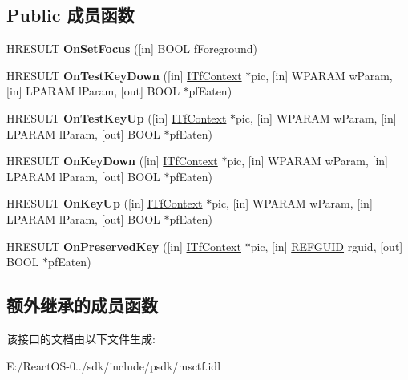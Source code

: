 \subsection*{Public 成员函数}
\begin{DoxyCompactItemize}
\item 
\mbox{\label{interface_i_tf_key_event_sink_ab5d245d1cc541701333e56dedc5832b3}} 
H\+R\+E\+S\+U\+LT {\bfseries On\+Set\+Focus} (\mbox{[}in\mbox{]} B\+O\+OL f\+Foreground)
\item 
\mbox{\label{interface_i_tf_key_event_sink_ac73b3ced70cd2eb7e9aee17ff839966a}} 
H\+R\+E\+S\+U\+LT {\bfseries On\+Test\+Key\+Down} (\mbox{[}in\mbox{]} \hyperlink{interface_i_tf_context}{I\+Tf\+Context} $\ast$pic, \mbox{[}in\mbox{]} W\+P\+A\+R\+AM w\+Param, \mbox{[}in\mbox{]} L\+P\+A\+R\+AM l\+Param, \mbox{[}out\mbox{]} B\+O\+OL $\ast$pf\+Eaten)
\item 
\mbox{\label{interface_i_tf_key_event_sink_a98bb99ca64e60dde14b9541c665eb604}} 
H\+R\+E\+S\+U\+LT {\bfseries On\+Test\+Key\+Up} (\mbox{[}in\mbox{]} \hyperlink{interface_i_tf_context}{I\+Tf\+Context} $\ast$pic, \mbox{[}in\mbox{]} W\+P\+A\+R\+AM w\+Param, \mbox{[}in\mbox{]} L\+P\+A\+R\+AM l\+Param, \mbox{[}out\mbox{]} B\+O\+OL $\ast$pf\+Eaten)
\item 
\mbox{\label{interface_i_tf_key_event_sink_a6fa610a788e4e2bc84f3a706a353c84e}} 
H\+R\+E\+S\+U\+LT {\bfseries On\+Key\+Down} (\mbox{[}in\mbox{]} \hyperlink{interface_i_tf_context}{I\+Tf\+Context} $\ast$pic, \mbox{[}in\mbox{]} W\+P\+A\+R\+AM w\+Param, \mbox{[}in\mbox{]} L\+P\+A\+R\+AM l\+Param, \mbox{[}out\mbox{]} B\+O\+OL $\ast$pf\+Eaten)
\item 
\mbox{\label{interface_i_tf_key_event_sink_a482924c02872c4e51810ff33737ba2bb}} 
H\+R\+E\+S\+U\+LT {\bfseries On\+Key\+Up} (\mbox{[}in\mbox{]} \hyperlink{interface_i_tf_context}{I\+Tf\+Context} $\ast$pic, \mbox{[}in\mbox{]} W\+P\+A\+R\+AM w\+Param, \mbox{[}in\mbox{]} L\+P\+A\+R\+AM l\+Param, \mbox{[}out\mbox{]} B\+O\+OL $\ast$pf\+Eaten)
\item 
\mbox{\label{interface_i_tf_key_event_sink_ab868bf5686684aac0a01659bb181a04e}} 
H\+R\+E\+S\+U\+LT {\bfseries On\+Preserved\+Key} (\mbox{[}in\mbox{]} \hyperlink{interface_i_tf_context}{I\+Tf\+Context} $\ast$pic, \mbox{[}in\mbox{]} \hyperlink{struct___g_u_i_d}{R\+E\+F\+G\+U\+ID} rguid, \mbox{[}out\mbox{]} B\+O\+OL $\ast$pf\+Eaten)
\end{DoxyCompactItemize}
\subsection*{额外继承的成员函数}


该接口的文档由以下文件生成\+:\begin{DoxyCompactItemize}
\item 
E\+:/\+React\+O\+S-\/0../sdk/include/psdk/msctf.\+idl\end{DoxyCompactItemize}
